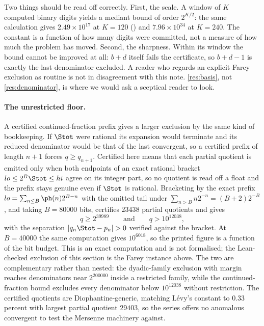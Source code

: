 Two things should be read off correctly.  First, the scale.  A window of $K$
computed binary digits yields a mediant bound of order $2^{K/2}$: the same
calculation gives $2.49\times10^{17}$ at $K=120$
()
and $7.96\times10^{34}$ at $K=240$.  The constant is a function of how many
digits were committed, not a measure of how much the problem has moved.
Second, the sharpness.  Within its window the bound cannot be improved at all:
$b+d$ itself fails the certificate, so $b+d-1$ is exactly the last denominator
excluded.  A reader who regards an explicit Farey exclusion as routine is not
in disagreement with this note.  \ref{res:basis}, not \ref{res:denominator},
is where we would ask a sceptical reader to look.

\paragraph{The unrestricted floor.}
A certified continued-fraction prefix gives a larger exclusion by the same
kind of bookkeeping.  If $\Stot$ were rational its expansion would terminate
and its reduced denominator would be that of the last convergent, so a
certified prefix of length $n+1$ forces $q\ge q_{n+1}$.  Certified here means
that each partial quotient is emitted only when both endpoints of an exact
rational bracket $lo\le2^B\Stot\le hi$ agree on its integer part, so no
quotient is read off a float and the prefix stays genuine even if $\Stot$ is
rational.  Bracketing by the exact prefix
$lo=\sum_{n\le B}\ph(n)2^{B-n}$ with the omitted tail under
$\sum_{n>B}n2^{-n}=(B+2)2^{-B}$, and taking $B=80000$ bits, certifies $23438$
partial quotients and gives
\[
  q\ge2^{39989}\qquad\text{and}\qquad q>10^{12038},
\]
with the separation $|q_n\Stot-p_n|>0$ verified against the bracket.  At
$B=40000$ the same computation gives $10^{6018}$, so the printed figure is a
function of the bit budget.  This is an exact computation and is not
formalised; the Lean-checked exclusion of this section is the Farey instance
above.  The two are complementary rather than nested: the dyadic-family
exclusion with margin reaches denominators near $2^{200000}$ inside a
restricted family, while the continued-fraction bound excludes every
denominator below $10^{12038}$ without restriction.  The certified quotients
are Diophantine-generic, matching L\'evy's constant to $0.33$ percent with
largest partial quotient $29403$, so the series offers no anomalous convergent
to test the Mersenne machinery against.

